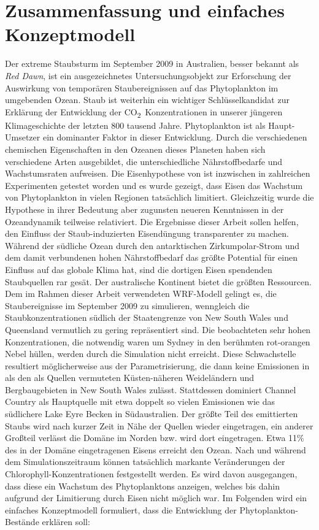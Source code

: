 \documentclass[12pt,a4paper,onecolumn,headheight=30pt]{scrartcl}
\newcommand{\cotwo}{CO\textsubscript{2}}
\begin{document}
\section{Zusammenfassung und einfaches Konzeptmodell} \label{sec:conclusion}
Der extreme Staubsturm im September 2009 in Australien, besser bekannt als \textit{Red Dawn}, ist ein ausgezeichnetes Untersuchungsobjekt zur Erforschung der Auswirkung von temporären Staubereignissen auf das Phytoplankton im umgebenden Ozean. Staub ist weiterhin ein wichtiger Schlüsselkandidat zur Erklärung der Entwicklung der \cotwo \ Konzentrationen in unserer jüngeren Klimageschichte der letzten 800 tausend Jahre. Phytoplankton ist als Haupt-Umsetzer ein dominanter Faktor in dieser Entwicklung. Durch die verschiedenen chemischen Eigenschaften in den Ozeanen dieses Planeten haben sich verschiedene Arten ausgebildet, die unterschiedliche Nährstoffbedarfe und Wachstumsraten aufweisen. Die Eisenhypothese von \citet{Martin.1990} ist inzwischen in zahlreichen Experimenten \citep{Boyd.2007} getestet worden und es wurde gezeigt, dass Eisen das Wachstum von Phytoplankton in vielen Regionen tatsächlich limitiert. Gleichzeitig wurde die Hypothese in ihrer Bedeutung aber zugunsten neueren Kenntnissen in der Ozeandynamik \cite{Tagliabue.2017} teilweise relativiert. Die Ergebnisse dieser Arbeit sollen helfen, den Einfluss der Staub-induzierten Eisendüngung transparenter zu machen. Während der südliche Ozean durch den antarktischen Zirkumpolar-Strom und dem damit verbundenen hohen Nährstoffbedarf das größte Potential für einen Einfluss auf das globale Klima hat, sind die dortigen Eisen spendenden Staubquellen rar gesät. Der australische Kontinent bietet die größten Ressourcen. Dem im Rahmen dieser Arbeit verwendeten WRF-Modell gelingt es, die Staubereignisse im September 2009 zu simulieren, wenngleich die Staubkonzentrationen südlich der Staatengrenze von New South Wales und Queensland vermutlich zu gering repräsentiert sind. Die beobachteten sehr hohen Konzentrationen, die notwendig waren um Sydney in den berühmten rot-orangen Nebel hüllen, werden durch die Simulation nicht erreicht. Diese Schwachstelle resultiert möglicherweise aus der Parametrisierung, die dann keine Emissionen in als den als Quellen vermuteten \citep{Leys.2011} Küsten-näheren Weideländern und Bergbaugebieten in New South Wales zulässt. Stattdessen dominiert Channel Country als Hauptquelle mit etwa doppelt so vielen Emissionen wie das südlichere Lake Eyre Becken in Südaustralien. Der größte Teil des emittierten Staubs wird nach kurzer Zeit in Nähe der Quellen wieder eingetragen, ein anderer Großteil verlässt die Domäne im Norden bzw. wird dort eingetragen. Etwa 11\% des in der Domäne eingetragenen Eisens erreicht den Ozean. Nach und während dem Simulationszeitraum können tatsächlich markante Veränderungen der Chlorophyll-Konzentrationen festgestellt werden. Es wird davon ausgegangen, dass diese ein Wachstum des Phytoplanktons anzeigen, welches bis dahin aufgrund der Limitierung durch Eisen nicht möglich war. Im Folgenden wird ein einfaches Konzeptmodell formuliert, dass die Entwicklung der Phytoplankton-Bestände erklären soll: \\
\end{document}
